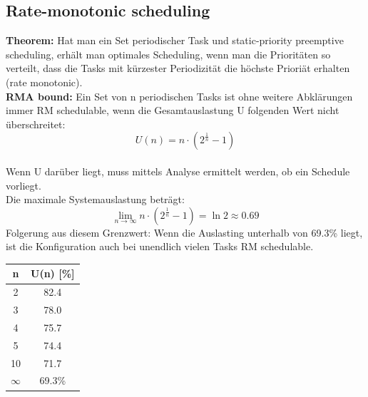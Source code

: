 \subsection{Rate-monotonic scheduling}
\begin{minipage}{0.8\linewidth}
\textbf{Theorem:}
Hat man ein Set periodischer Task und static-priority preemptive scheduling, erhält man optimales Scheduling, wenn man die Prioritäten so verteilt, dass die Tasks mit kürzester Periodizität die höchste Prioriät erhalten (rate monotonic).\\
\textbf{RMA bound:}
Ein Set von n periodischen Tasks ist ohne weitere Abklärungen immer RM schedulable, wenn die Gesamtauslastung U folgenden Wert nicht überschreitet:
\begin{equation}
U(n) = n\cdot (2^{\frac{1}{n}}-1)
\end{equation}\\
Wenn U darüber liegt, muss mittels Analyse ermittelt werden, ob ein Schedule vorliegt.\\

Die maximale Systemauslastung beträgt:
\begin{equation}
\lim_{n \to \infty}n\cdot(2^\frac{1}{n}-1) = \ln 2 \approx 0.69
\end{equation}
Folgerung aus diesem Grenzwert: Wenn die Auslasting unterhalb von 69.3\% liegt, ist die Konfiguration auch bei unendlich vielen Tasks RM schedulable.
\end{minipage}
\begin{minipage}{0.2\linewidth}
\centering
\begin{tabular}{| c | c |}
\hline
n & U(n) [\%]\\
\hline
2 & 82.4\\
3 & 78.0\\
4 & 75.7\\
5 & 74.4\\
10 & 71.7\\
$\infty$ & 69.3\%\\
\hline
\end{tabular}
\end{minipage}

